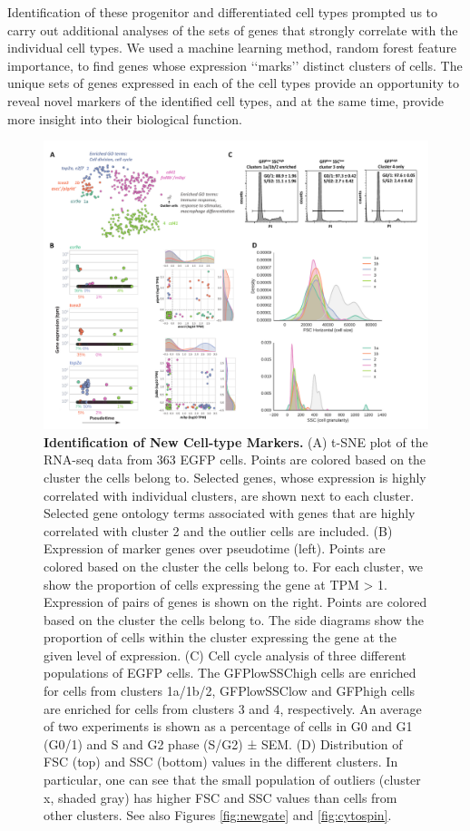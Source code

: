 Identification of these progenitor and differentiated cell types prompted us to carry out additional analyses of the sets of genes that strongly correlate with the individual cell types. We used a machine learning method, random forest feature importance, to find genes whose expression ‘‘marks’’ distinct clusters of cells. The unique sets of genes expressed in each of the cell types provide an opportunity to reveal novel markers of the identified cell types, and at the same time, provide more insight into their biological function.

\begin{figure}
    \centering
    \includegraphics[width=\textwidth]{"Figure4"}
    \caption[Identification of New Cell-type Markers]{\textbf{Identification of New Cell-type Markers.} (A) t-SNE plot of the RNA-seq data from 363 EGFP cells. Points are colored based on the cluster the cells belong to. Selected genes, whose expression is highly correlated with individual clusters, are shown next to each cluster. Selected gene ontology terms associated with genes that are highly correlated with cluster 2 and the outlier cells are included. (B) Expression of marker genes over pseudotime (left). Points are colored based on the cluster the cells belong to. For each cluster, we show the proportion of cells expressing the gene at TPM > 1. Expression of pairs of genes is shown on the right. Points are colored based on the cluster the cells belong to. The side diagrams show the proportion of cells within the cluster expressing the gene at the given level of expression. (C) Cell cycle analysis of three different populations of EGFP cells. The GFPlowSSChigh cells are enriched for cells from clusters 1a/1b/2, GFPlowSSClow and GFPhigh cells are enriched for cells from clusters 3 and 4, respectively. An average of two experiments is shown as a percentage of cells in G0 and G1 (G0/1) and S and G2 phase (S/G2) ± SEM. (D) Distribution of FSC (top) and SSC (bottom) values in the different clusters. In particular, one can see that the small population of outliers (cluster x, shaded gray) has higher FSC and SSC values than cells from other clusters. See also Figures \ref{fig:newgate} and \ref{fig:cytospin}.}
    \label{fig:clusters}
\end{figure}

